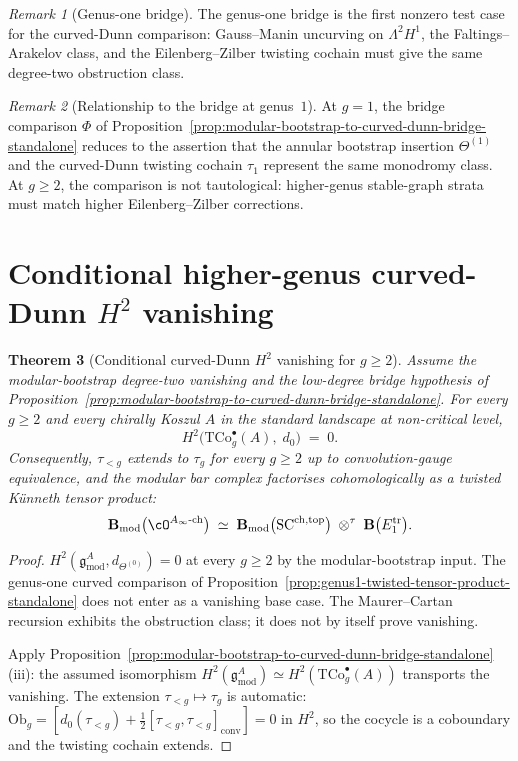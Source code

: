 \documentclass[11pt]{amsart}
\newtheorem{theorem}{Theorem}[section]
\theoremstyle{definition}
\theoremstyle{remark}
\newtheorem{remark}[theorem]{Remark}
\providecommand{\Ainf}{A_\infty}
\providecommand{\Bmod}{\mathbf{B}_{\mathrm{mod}}}
\begin{document}
\begin{remark}[Genus-one bridge]%
\label{rem:genus-one-bridge-standalone}%
The genus-one bridge is the first nonzero test case for the
curved-Dunn comparison: Gauss--Manin uncurving on $\Lambda^2H^1$, the
Faltings--Arakelov class, and the Eilenberg--Zilber twisting cochain
must give the same degree-two obstruction class.
\end{remark}

\begin{remark}[Relationship to the bridge at genus~$1$]%
\label{rem:bridge-at-genus-1-standalone}%
At $g = 1$, the bridge comparison $\Phi$ of
Proposition~\ref{prop:modular-bootstrap-to-curved-dunn-bridge-standalone}
reduces to the assertion that the annular bootstrap insertion
$\Theta^{(1)}$ and the curved-Dunn twisting cochain $\tau_1$ represent
the same monodromy class. At $g \ge 2$, the comparison is not
tautological: higher-genus stable-graph strata must match higher
Eilenberg--Zilber corrections.
\end{remark}

\section{Conditional higher-genus curved-Dunn $H^2$ vanishing}
\label{sec:higher-genus-vanishing-standalone}

\begin{theorem}[Conditional curved-Dunn $H^2$ vanishing for $g\ge2$]%
\label{thm:curved-dunn-H2-vanishing-higher-genus-standalone}%
Assume the modular-bootstrap degree-two vanishing and the low-degree
bridge hypothesis of
Proposition~\ref{prop:modular-bootstrap-to-curved-dunn-bridge-standalone}.
For every $g \ge 2$ and every chirally Koszul $A$ in the standard
landscape at non-critical level,
\[
  H^2\bigl(\mathrm{TCo}^\bullet_g(A),\; d_0\bigr) \;=\; 0.
\]
Consequently, $\tau_{<g}$ extends to $\tau_g$ for every $g\ge2$ up to
convolution-gauge equivalence, and the modular bar complex factorises
cohomologically as a twisted K\"unneth tensor product:
\[
  \Bmod\bigl(\cO^{\Ainf\text{-ch}}\bigr)
  \;\simeq\;
  \Bmod\bigl(\mathrm{SC}^{\mathrm{ch,top}}\bigr)
  \;\otimes^{\tau}\;
  \mathbf{B}\bigl(E_1^{\mathrm{tr}}\bigr).
\]
\end{theorem}

\begin{proof}
$H^2(\mathfrak{g}^A_{\mathrm{mod}}, d_{\Theta^{(0)}}) = 0$ at every
$g \ge 2$ by the modular-bootstrap input.  The genus-one curved
comparison of Proposition~\ref{prop:genus1-twisted-tensor-product-standalone}
does not enter as a vanishing base case.  The Maurer--Cartan recursion
exhibits the obstruction class; it does not by itself prove
vanishing.

Apply Proposition~\ref{prop:modular-bootstrap-to-curved-dunn-bridge-standalone}(iii):
the assumed isomorphism
$H^2(\mathfrak{g}^A_{\mathrm{mod}}) \simeq
H^2(\mathrm{TCo}^\bullet_g(A))$
transports the vanishing. The extension
$\tau_{<g} \mapsto \tau_g$ is automatic:
$\mathrm{Ob}_g = [d_0(\tau_{<g}) +
\tfrac{1}{2}[\tau_{<g}, \tau_{<g}]_{\mathrm{conv}}] = 0$ in
$H^2$, so the cocycle is a coboundary and the twisting cochain
extends.
\end{proof}
\end{document}

